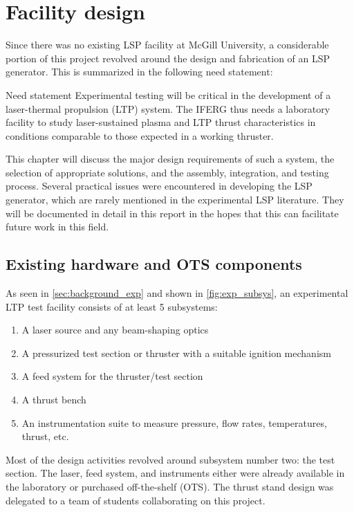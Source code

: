 \chapter{Facility design}
    Since there was no existing LSP facility at McGill University, a considerable portion of this project revolved around the design and fabrication of an LSP generator. This is summarized in the following need statement:

    \begin{statement}{Need statement} 
        Experimental testing will be critical in the development of a laser-thermal propulsion (LTP) system. The IFERG thus needs a laboratory facility to study laser-sustained plasma and LTP thrust characteristics in conditions comparable to those expected in a working thruster.
    \end{statement}
    
    This chapter will discuss the major design requirements of such a system, the selection of appropriate solutions, and the assembly, integration, and testing process. Several practical issues were encountered in developing the LSP generator, which are rarely mentioned in the experimental LSP literature. They will be documented in detail in this report in the hopes that this can facilitate future work in this field.

    \section{Existing hardware and OTS components} \label{sec:design_ots}
        As seen in \autoref{sec:background_exp} and shown in \autoref{fig:exp_subsys}, an experimental LTP test facility consists of at least 5 subsystems:
        \begin{enumerate}
            \item A laser source and any beam-shaping optics
            \item A pressurized test section or thruster with a suitable ignition mechanism
            \item A feed system for the thruster/test section
            \item A thrust bench
            \item An instrumentation suite to measure pressure, flow rates, temperatures, thrust, etc.
        \end{enumerate}

        Most of the design activities revolved around subsystem number two: the test section. The laser, feed system, and instruments either were already available in the laboratory or purchased off-the-shelf (OTS). The thrust stand design was delegated to a team of students collaborating on this project.

